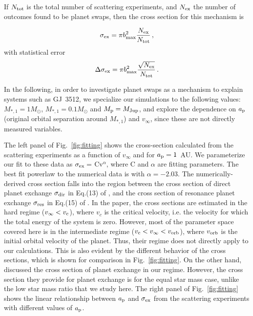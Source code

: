 \documentclass[twocolumn]{aastex62}
\begin{document}
If $N_{\rm tot}$ is the total number of scattering experiments, and $N_{\rm ex}$ the number of outcomes found to be planet swaps, then the cross section for this mechanism is \citep[e.g.][]{hut83}

\begin{equation}
\sigma_{\rm ex} = \pi b_{\rm max}^2\frac{N_{\rm ex}}{N_{\rm tot}}\,,
\end{equation}
with statistical error
\begin{equation}
\Delta\sigma_{\rm ex} = \pi b_{\rm max}^2\frac{\sqrt{N_{\rm ex}}}{N_{\rm tot}}\,.
\end{equation}


In the following, in order to investigate planet swaps as a mechanism to explain systems 
such as GJ~3512, we specialize 
our simulations to the following values:  $M_{*,1}=1M_\odot$, $M_{*,1}=0.1M_\odot$ and $M_{\rm p}=M_{\rm Jup}$, and explore the dependence on $a_{\rm p}$ (original orbital separation around $M_{*,1}$) and $v_\infty$, since these are not directly measured variables.

The left panel of Fig.~\ref{fig:fitting} shows the cross-section calculated from the scattering experiments as a function of $v_\infty$ and for $a_{\rm p}=1$~AU.  We parameterize our fit to these data as $\sigma_{\rm ex} =$ Cv$^{\alpha}$, where C and $\alpha$ are fitting parameters.  The best fit powerlaw to the numerical data is with $\alpha=-2.03$. {\color{red}The numerically-derived cross section falls into the region between the cross section of direct planet exchange $\sigma_{\rm dir}$ in Eq.(13) of \citet{Heggie96}, and the cross section of resonance planet exchange $\sigma_{\rm res}$ in Eq.(15) of \citet{Heggie96}. In the \citet{Heggie96} paper, the cross sections are estimated in the hard regime ($v_\infty < v_{\rm c}$), where $v_c$ is the critical velocity, i.e. the velocity for which the total energy of the system is zero. However, most of the parameter space covered here is in the intermediate regime ($v_{\rm c} < v_\infty < v_{\rm orb}$), where $v_{\rm orb}$ is the initial orbital velocity of the planet. Thus,  their regime does not directly apply to our calculations. This is also evident by the different behavior of the cross sections, which is shown for comparison in Fig.~\ref{fig:fitting}. On the other hand, \citet{Fregeau2006} discussed the cross section of planet exchange in our regime. However, the cross section they provide for planet exchange is for the equal star mass case, unlike  the low star mass ratio that we study here.} The right panel of Fig.~\ref{fig:fitting} shows the linear relationship between $a_{\rm p}$ and $\sigma_{\rm ex}$ from the scattering experiments with different values of $a_{\rm p}$. 
\end{document}
